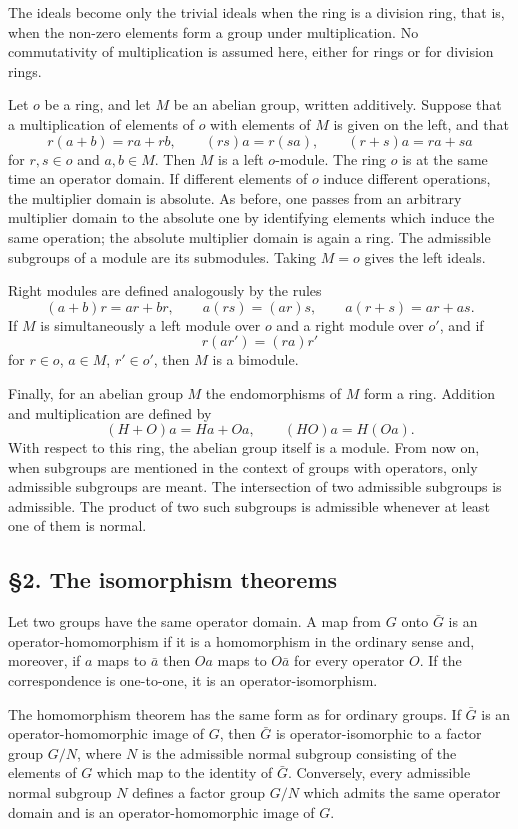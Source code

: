 \documentclass[11pt]{article}
\begin{document}
The ideals become only the trivial ideals when the ring is a division
ring, that is, when the non-zero elements form a group under
multiplication. No commutativity of multiplication is assumed here,
either for rings or for division rings.

Let \(o\) be a ring, and let \(M\) be an abelian group, written
additively. Suppose that a multiplication of elements of \(o\) with
elements of \(M\) is given on the left, and that \[
  r(a+b)=ra+rb,
  \qquad
  (rs)a=r(sa),
  \qquad
  (r+s)a=ra+sa
\] for \(r,s\in o\) and \(a,b\in M\). Then \(M\) is a left \(o\)-module.
The ring \(o\) is at the same time an operator domain. If different
elements of \(o\) induce different operations, the multiplier domain is
absolute. As before, one passes from an arbitrary multiplier domain to
the absolute one by identifying elements which induce the same
operation; the absolute multiplier domain is again a ring. The
admissible subgroups of a module are its submodules. Taking \(M=o\)
gives the left ideals.

Right modules are defined analogously by the rules \[
  (a+b)r=ar+br,
  \qquad
  a(rs)=(ar)s,
  \qquad
  a(r+s)=ar+as.
\] If \(M\) is simultaneously a left module over \(o\) and a right
module over \(o'\), and if \[
  r(ar')=(ra)r'
\] for \(r\in o\), \(a\in M\), \(r'\in o'\), then \(M\) is a bimodule.

Finally, for an abelian group \(M\) the endomorphisms of \(M\) form a
ring. Addition and multiplication are defined by \[
  (H+O)a=Ha+Oa,
  \qquad
  (HO)a=H(Oa).
\] With respect to this ring, the abelian group itself is a module. From
now on, when subgroups are mentioned in the context of groups with
operators, only admissible subgroups are meant. The intersection of two
admissible subgroups is admissible. The product of two such subgroups is
admissible whenever at least one of them is normal.

\subsection{§2. The isomorphism
theorems}\label{the-isomorphism-theorems}

Let two groups have the same operator domain. A map from \(G\) onto
\(\bar G\) is an operator-homomorphism if it is a homomorphism in the
ordinary sense and, moreover, if \(a\) maps to \(\bar a\) then \(Oa\)
maps to \(O\bar a\) for every operator \(O\). If the correspondence is
one-to-one, it is an operator-isomorphism.

The homomorphism theorem has the same form as for ordinary groups. If
\(\bar G\) is an operator-homomorphic image of \(G\), then \(\bar G\) is
operator-isomorphic to a factor group \(G/N\), where \(N\) is the
admissible normal subgroup consisting of the elements of \(G\) which map
to the identity of \(\bar G\). Conversely, every admissible normal
subgroup \(N\) defines a factor group \(G/N\) which admits the same
operator domain and is an operator-homomorphic image of \(G\).
\end{document}
